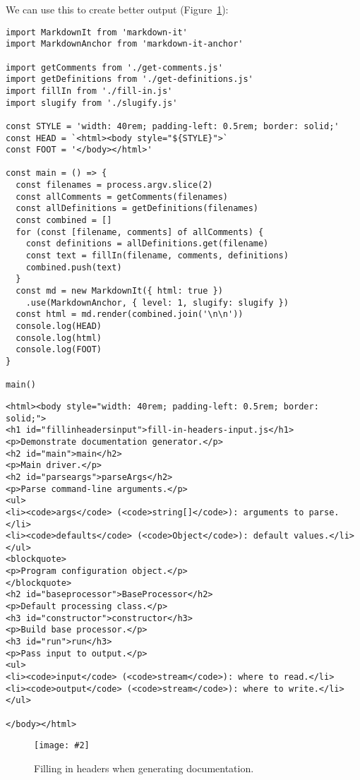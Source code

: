 \documentclass[krantzl]{krantz}
\newcommand{\figpdf}[4]{\begin{figure}%
\centering%
\texttt{[image: \#2]}%
\caption{#3}%
\label{#1}%
\end{figure}}
\newcommand{\figref}[1]{Figure~\ref{#1}}
\begin{document}
We can use this to create better output (\figref{doc-generator-fill-in-headers}):


\begin{lstlisting}[frame=tblr]
import MarkdownIt from 'markdown-it'
import MarkdownAnchor from 'markdown-it-anchor'

import getComments from './get-comments.js'
import getDefinitions from './get-definitions.js'
import fillIn from './fill-in.js'
import slugify from './slugify.js'

const STYLE = 'width: 40rem; padding-left: 0.5rem; border: solid;'
const HEAD = `<html><body style="${STYLE}">`
const FOOT = '</body></html>'

const main = () => {
  const filenames = process.argv.slice(2)
  const allComments = getComments(filenames)
  const allDefinitions = getDefinitions(filenames)
  const combined = []
  for (const [filename, comments] of allComments) {
    const definitions = allDefinitions.get(filename)
    const text = fillIn(filename, comments, definitions)
    combined.push(text)
  }
  const md = new MarkdownIt({ html: true })
    .use(MarkdownAnchor, { level: 1, slugify: slugify })
  const html = md.render(combined.join('\n\n'))
  console.log(HEAD)
  console.log(html)
  console.log(FOOT)
}

main()
\end{lstlisting}



\begin{lstlisting}[frame=tblr,backgroundcolor=\color{black!5}]
<html><body style="width: 40rem; padding-left: 0.5rem; border: solid;">
<h1 id="fillinheadersinput">fill-in-headers-input.js</h1>
<p>Demonstrate documentation generator.</p>
<h2 id="main">main</h2>
<p>Main driver.</p>
<h2 id="parseargs">parseArgs</h2>
<p>Parse command-line arguments.</p>
<ul>
<li><code>args</code> (<code>string[]</code>): arguments to parse.</li>
<li><code>defaults</code> (<code>Object</code>): default values.</li>
</ul>
<blockquote>
<p>Program configuration object.</p>
</blockquote>
<h2 id="baseprocessor">BaseProcessor</h2>
<p>Default processing class.</p>
<h3 id="constructor">constructor</h3>
<p>Build base processor.</p>
<h3 id="run">run</h3>
<p>Pass input to output.</p>
<ul>
<li><code>input</code> (<code>stream</code>): where to read.</li>
<li><code>output</code> (<code>stream</code>): where to write.</li>
</ul>

</body></html>
\end{lstlisting}


\figpdf{doc-generator-fill-in-headers}{./doc-generator/fill-in-headers.pdf}{Filling in headers when generating documentation.}{0.4}
\end{document}
